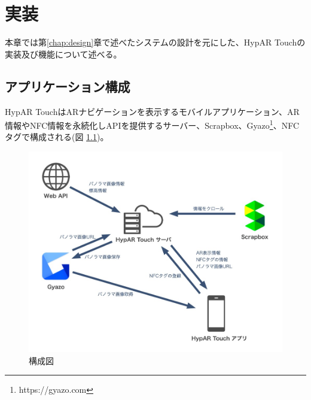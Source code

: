 \chapter{実装}
\label{chap:implementation}

本章では第\ref{chap:design}章で述べたシステムの設計を元にした、HypAR Touchの実装及び機能について述べる。

\newpage

\section{アプリケーション構成}
HypAR TouchはARナビゲーションを表示するモバイルアプリケーション、AR情報やNFC情報を永続化しAPIを提供するサーバー、Scrapbox、Gyazo\footnote{\textsf{https://gyazo.com}}、NFCタグで構成される(図 \ref{fig:application_structure})。

\begin{figure}[H]
  \centering
  \includegraphics[width=150mm]{images/application_structure.jpg}
  \caption{構成図} \label{fig:application_structure}
\end{figure}

